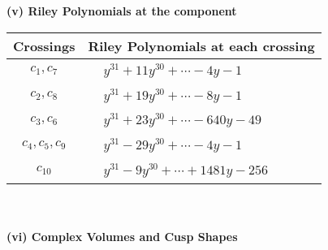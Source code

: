 \documentclass[1p]{elsarticle_modified}
\theoremstyle{definition}
\begin{document}
\newpage\renewcommand{\arraystretch}{1}
\flushleft \textbf{(v) Riley Polynomials at the component}\newline \\
\begin{tabular}{m{50pt}|m{274pt}}
Crossings & \hspace{64pt}Riley Polynomials at each crossing \\
\hline $$\begin{aligned}c_{1},c_{7}\end{aligned}$$&$\begin{aligned}
&y^{31}+11 y^{30}+\cdots-4 y-1
\end{aligned}$\\
\hline $$\begin{aligned}c_{2},c_{8}\end{aligned}$$&$\begin{aligned}
&y^{31}+19 y^{30}+\cdots-8 y-1
\end{aligned}$\\
\hline $$\begin{aligned}c_{3},c_{6}\end{aligned}$$&$\begin{aligned}
&y^{31}+23 y^{30}+\cdots-640 y-49
\end{aligned}$\\
\hline $$\begin{aligned}c_{4},c_{5},c_{9}\end{aligned}$$&$\begin{aligned}
&y^{31}-29 y^{30}+\cdots-4 y-1
\end{aligned}$\\
\hline $$\begin{aligned}c_{10}\end{aligned}$$&$\begin{aligned}
&y^{31}-9 y^{30}+\cdots+1481 y-256
\end{aligned}$\\
\hline
\end{tabular}\\~\\
\newpage\flushleft \textbf{(vi) Complex Volumes and Cusp Shapes}
\end{document}
